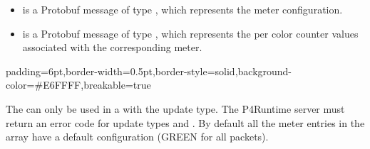 \documentclass[11pt]{article}
\begin{document}
{\begin{itemize}
\item{}
 is a Protobuf message of type , which represents the
meter configuration.%

\item{}
 is a Protobuf message of type , which
represents the per color counter values associated with the corresponding
meter.%
\end{itemize}%

\begin{mdbmargintb}{6pt}{6pt}%
\begin{mdblock}{padding=6pt,border-width=0.5pt,border-style=solid,background-color=\#E6FFFF,breakable=true}%
\begin{mdpre}%
\end{mdpre}%
\end{mdblock}%
\end{mdbmargintb}%

\noindent{}The  can only be used in a  with the  update
type.  The P4Runtime server must return an  error code for
update types  and . By default all the meter entries in the
array have a default configuration (GREEN for all packets).%

}
\end{document}

